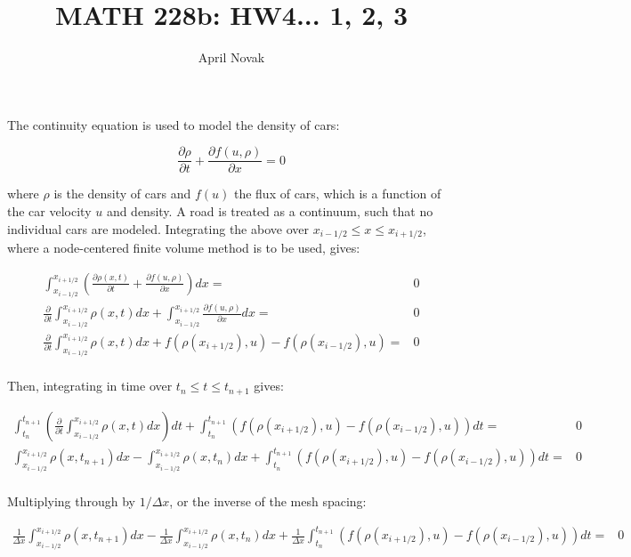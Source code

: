 \documentclass[10pt]{article}
\newcommand{\beq}{\begin{equation}}
\newcommand{\eeq}{\end{equation}}
\newcommand{\beqa}{\begin{equation}\begin{aligned}}
\newcommand{\eeqa}{\end{aligned}\end{equation}}
\begin{document}
\title{MATH 228b: HW4... 1, 2, 3}
\author{April Novak}

\maketitle

\section{}

The continuity equation is used to model the density of cars:

\beq
\frac{\partial\rho}{\partial t}+\frac{\partial f(u, \rho)}{\partial x}=0
\eeq

where \(\rho\) is the density of cars and \(f(u)\) the flux of cars, which is a function of the car velocity \(u\) and density. A road is treated as a continuum, such that no individual cars are modeled. Integrating the above over \(x_{i-1/2}\leq x\leq x_{i+1/2}\), where a node-centered finite volume method is to be used, gives:

\beqa
\int_{x_{i-1/2}}^{x_{i+1/2}}\left(\frac{\partial\rho(x,t)}{\partial t}+\frac{\partial f(u, \rho)}{\partial x}\right)dx=&0\\
\frac{\partial}{\partial t}\int_{x_{i-1/2}}^{x_{i+1/2}}\rho(x,t) dx+\int_{x_{i-1/2}}^{x_{i+1/2}}\frac{\partial f(u, \rho)}{\partial x}dx=&0\\
\frac{\partial}{\partial t}\int_{x_{i-1/2}}^{x_{i+1/2}}\rho(x,t) dx+f(\rho(x_{i+1/2}), u)-f(\rho(x_{i-1/2}), u)=&0\\
\eeqa

Then, integrating in time over \(t_{n}\leq t\leq t_{n+1}\) gives:

\beqa
\int_{t_n}^{t_{n+1}}\left(\frac{\partial}{\partial t}\int_{x_{i-1/2}}^{x_{i+1/2}}\rho(x,t) dx\right)dt+\int_{t_n}^{t_{n+1}}\left(f(\rho(x_{i+1/2}), u)-f(\rho(x_{i-1/2}), u)\right)dt=&0\\
\int_{x_{i-1/2}}^{x_{i+1/2}}\rho(x, t_{n+1}) dx-\int_{x_{i-1/2}}^{x_{i+1/2}}\rho(x, t_{n}) dx+\int_{t_n}^{t_{n+1}}\left(f(\rho(x_{i+1/2}), u)-f(\rho(x_{i-1/2}), u)\right)dt=&0\\
\eeqa

Multiplying through by \(1/\Delta x\), or the inverse of the mesh spacing:

\beqa
\label{eq:1}
\frac{1}{\Delta x}\int_{x_{i-1/2}}^{x_{i+1/2}}\rho(x, t_{n+1}) dx-\frac{1}{\Delta x}\int_{x_{i-1/2}}^{x_{i+1/2}}\rho(x, t_{n}) dx+\frac{1}{\Delta x}\int_{t_n}^{t_{n+1}}\left(f(\rho(x_{i+1/2}), u)-f(\rho(x_{i-1/2}), u)\right)dt=&0\\
\eeqa
\end{document}
